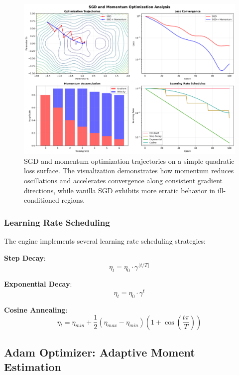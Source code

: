 \documentclass[11pt,a4paper]{report}
\begin{document}
\begin{figure}[H]
\centering
\includegraphics[width=\textwidth]{optimizer_sgd_momentum_analysis.png}
\caption{SGD and momentum optimization trajectories on a simple quadratic loss surface. The visualization demonstrates how momentum reduces oscillations and accelerates convergence along consistent gradient directions, while vanilla SGD exhibits more erratic behavior in ill-conditioned regions.}
\label{fig:sgd_momentum}
\end{figure}

\subsubsection{Learning Rate Scheduling}

The engine implements several learning rate scheduling strategies:

\textbf{Step Decay}:
\begin{equation}
\eta_t = \eta_0 \cdot \gamma^{\lfloor t/T \rfloor}
\end{equation}

\textbf{Exponential Decay}:
\begin{equation}
\eta_t = \eta_0 \cdot \gamma^t
\end{equation}

\textbf{Cosine Annealing}:
\begin{equation}
\eta_t = \eta_{min} + \frac{1}{2}(\eta_{max} - \eta_{min})\left(1 + \cos\left(\frac{t\pi}{T}\right)\right)
\end{equation}

\subsection{Adam Optimizer: Adaptive Moment Estimation}
\end{document}
